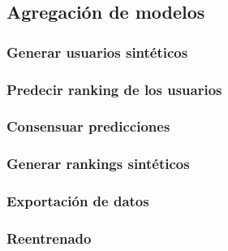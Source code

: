 \subsection{Agregación de modelos}\label{Consenso}

\subsubsection{Generar usuarios sintéticos}\label{Consenso:Usuarios_Sinteticos}


\subsubsection{Predecir ranking de los usuarios}

\subsubsection{Consensuar predicciones}

\subsubsection{Generar rankings sintéticos}

\subsubsection{Exportación de datos}

\subsubsection{Reentrenado}